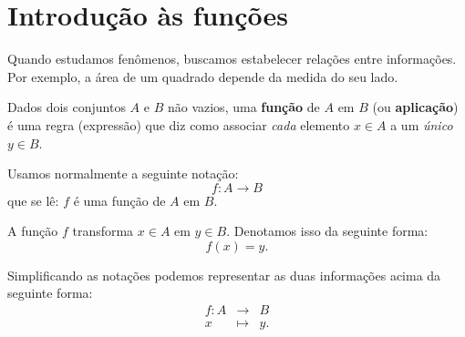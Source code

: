 

\chapter{Introdução às funções}

Quando estudamos fenômenos, buscamos estabelecer relações entre informações. Por exemplo, a área de um quadrado depende da medida do seu lado.

\begin{obs}
  Dados dois conjuntos $A$ e $B$ não vazios, uma \textbf{função} de $A$ em $B$ (ou \textbf{aplicação}) é uma regra (expressão) que diz como associar \emph{cada} elemento $x \in A$ a um \emph{único} $y \in B$.
\end{obs}

Usamos normalmente a seguinte notação:
\begin{equation*}
f: A \rightarrow B
\end{equation*}
que se lê: $f$ é uma função de $A$ em $B$.

A função $f$ transforma $x \in A$ em $y \in B$. Denotamos isso da seguinte forma:
\begin{equation*}
f(x) = y .
\end{equation*}

Simplificando as notações podemos representar as duas informações acima da seguinte forma:
\begin{eqnarray*}
 f: A & \rightarrow & B \\
 x & \mapsto & y.
\end{eqnarray*}

